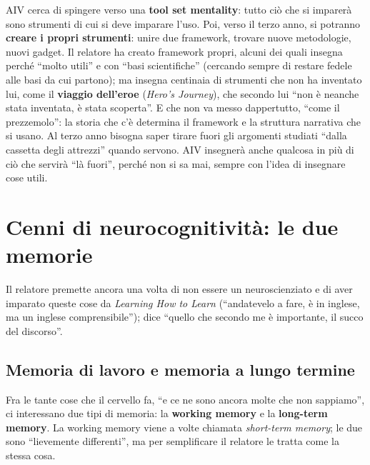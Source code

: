 AIV cerca di spingere verso una \textbf{tool set mentality}: tutto ciò che
si imparerà sono strumenti di cui si deve imparare l'uso. Poi, verso il
terzo anno, si potranno \textbf{creare i propri strumenti}: unire due
framework, trovare nuove metodologie, nuovi gadget. Il relatore ha creato
framework propri, alcuni dei quali insegna perché ``molto utili'' e con
``basi scientifiche'' (cercando sempre di restare fedele alle basi da cui
partono); ma insegna centinaia di strumenti che non ha inventato lui, come
il \textbf{viaggio dell'eroe} (\emph{Hero's Journey}), che secondo lui ``non
è neanche stata inventata, è stata scoperta''. E che non va messo dappertutto,
``come il prezzemolo'': la storia che c'è determina il framework e la
struttura narrativa che si usano. Al terzo anno bisogna saper tirare fuori
gli argomenti studiati ``dalla cassetta degli attrezzi'' quando servono. AIV
insegnerà anche qualcosa in più di ciò che servirà ``là fuori'', perché non
si sa mai, sempre con l'idea di insegnare cose utili.

\section{Cenni di neurocognitività: le due memorie}
\label{p0:sec:memoria}

Il relatore premette ancora una volta di non essere un neuroscienziato e di
aver imparato queste cose da \emph{Learning How to Learn} (``andatevelo a
fare, è in inglese, ma un inglese comprensibile''); dice ``quello che secondo
me è importante, il succo del discorso''.

\subsection{Memoria di lavoro e memoria a lungo termine}

Fra le tante cose che il cervello fa, ``e ce ne sono ancora molte che non
sappiamo'', ci interessano due tipi di memoria: la \textbf{working memory} e
la \textbf{long-term memory}. La working memory viene a volte chiamata
\emph{short-term memory}; le due sono ``lievemente differenti'', ma per
semplificare il relatore le tratta come la stessa cosa.

